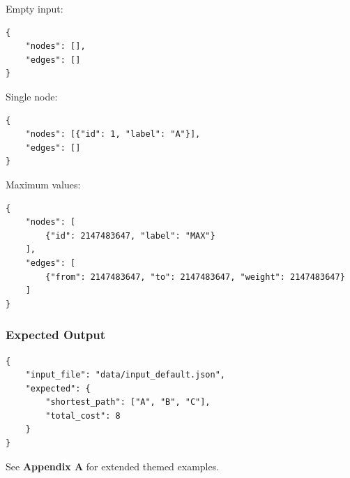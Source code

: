 Empty input:

\begin{lstlisting}[style=json]
{
    "nodes": [],
    "edges": []
}
\end{lstlisting}

Single node:

\begin{lstlisting}[style=json]
{
    "nodes": [{"id": 1, "label": "A"}],
    "edges": []
}
\end{lstlisting}

Maximum values:

\begin{lstlisting}[style=json]
{
    "nodes": [
        {"id": 2147483647, "label": "MAX"}
    ],
    "edges": [
        {"from": 2147483647, "to": 2147483647, "weight": 2147483647}
    ]
}
\end{lstlisting}

\subsubsection{Expected Output}

\begin{lstlisting}[style=json]
{
    "input_file": "data/input_default.json",
    "expected": {
        "shortest_path": ["A", "B", "C"],
        "total_cost": 8
    }
}
\end{lstlisting}

See \textbf{Appendix A} for extended themed examples.
